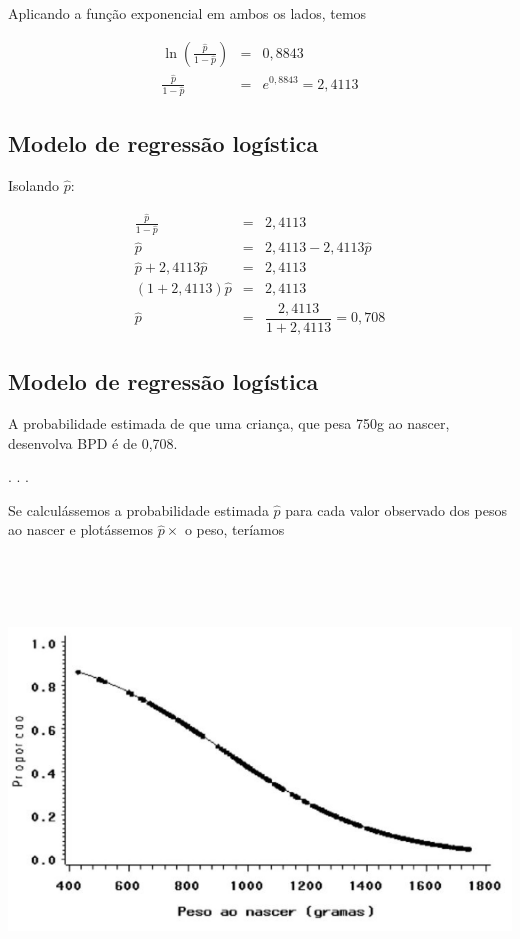 \documentclass[
  letterpaper,
  DIV=11,
  numbers=noendperiod]{scrartcl}
\begin{document}
Aplicando a função exponencial em ambos os lados, temos

\[
\begin{eqnarray*}
\ln\left ( \frac{\hat{p}}{1-\hat{p}} \right) &=& 0,8843 \\ \frac{\hat{p}}{1-\hat{p}} &=& e^{0,8843} = 2,4113
\end{eqnarray*}
\]

\subsection{Modelo de regressão
logística}\label{modelo-de-regressuxe3o-loguxedstica-5}

Isolando \(\hat{p}\):

\[
\begin{eqnarray*}
\frac{\hat{p}}{1-\hat{p}} &=& 2,4113 \\ \hat{p} &=& 2,4113 - 2,4113 \hat{p} \\ \hat{p} + 2,4113 \hat{p} &=& 2,4113 \\ (1 + 2,4113)\hat{p} &=& 2,4113 \\ \hat{p} &=& \dfrac{2,4113}{1 + 2,4113} = 0,708
\end{eqnarray*}
\]

\subsection{Modelo de regressão
logística}\label{modelo-de-regressuxe3o-loguxedstica-6}

A probabilidade estimada de que uma criança, que pesa 750g ao nascer,
desenvolva BPD é de 0,708.

. . .

Se calculássemos a probabilidade estimada \(\hat{p}\) para cada valor
observado dos pesos ao nascer e plotássemos \(\hat{p} \times\) o peso,
teríamos

\begin{center}
\includegraphics[width=6.25in,height=4.6875in]{../../images/graf_logs.png}
\end{center}
\end{document}
